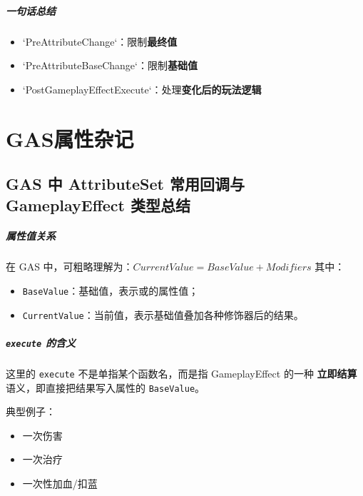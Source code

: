 \paragraph{一句话总结}
\begin{itemize}
	\item `PreAttributeChange`：限制\textbf{最终值}
	\item `PreAttributeBaseChange`：限制\textbf{基础值}
	\item `PostGameplayEffectExecute`：处理\textbf{变化后的玩法逻辑}
\end{itemize}









\chapter{GAS属性杂记}
\section{GAS 中 AttributeSet 常用回调与 GameplayEffect 类型总结}

\paragraph{属性值关系}
在 GAS 中，可粗略理解为：$CurrentValue = BaseValue + Modifiers$
其中：
\begin{itemize}
	\item \texttt{BaseValue}：基础值，表示或的属性值；
	\item \texttt{CurrentValue}：当前值，表示基础值叠加各种修饰器后的结果。
\end{itemize}

\paragraph{\texttt{execute} 的含义}
这里的 \texttt{execute} 不是单指某个函数名，而是指 GameplayEffect 的一种
\textbf{立即结算}语义，即直接把结果写入属性的 \texttt{BaseValue}。

典型例子：
\begin{itemize}
	\item 一次伤害
	\item 一次治疗
	\item 一次性加血/扣蓝
\end{itemize}

